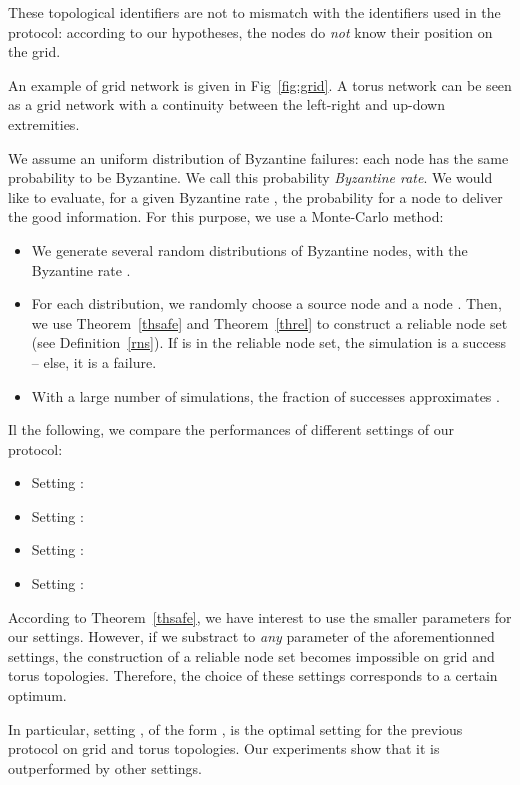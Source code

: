 \documentclass[a4paper,11pt]{article}
\begin{document}
These topological identifiers  are not to mismatch with the identifiers used in the protocol: according to our hypotheses, the nodes do \emph{not} know their position on the grid.

An example of grid network is given in Fig~\ref{fig:grid}.
A torus network can be seen as a grid network with a continuity between the left-right and up-down extremities.

We assume an uniform distribution of Byzantine failures: each node has the same probability  to be Byzantine. We call this probability \emph{Byzantine rate}. We would like to evaluate, for a given Byzantine rate , the probability  for a node to deliver the good information.
For this purpose, we use a Monte-Carlo method:

\begin{itemize}
\item We generate several random distributions of Byzantine nodes, with the Byzantine rate .
\item For each distribution, we randomly choose a source node  and a node . Then, we use Theorem~\ref{thsafe} and Theorem~\ref{threl} to construct a reliable node set (see Definition~\ref{rns}). If  is in the reliable node set, the simulation is a success -- else, it is a failure.
\item With a large number of simulations, the fraction of successes approximates .
\end{itemize}

Il the following, we compare the performances of  different settings of our protocol:
\begin{itemize}
\item Setting : 
\item Setting : 
\item Setting : 
\item Setting : 
\end{itemize}

According to Theorem~\ref{thsafe}, we have interest to use the smaller parameters  for our settings. However, if we substract  to \emph{any} parameter of the aforementionned settings, the construction of a reliable node set becomes impossible on grid and torus topologies. Therefore, the choice of these  settings corresponds to a certain optimum.

In particular, setting , of the form , is the optimal setting for the previous protocol \cite{Trig} on grid and torus topologies. Our experiments show that it is outperformed by other settings.
\end{document}
